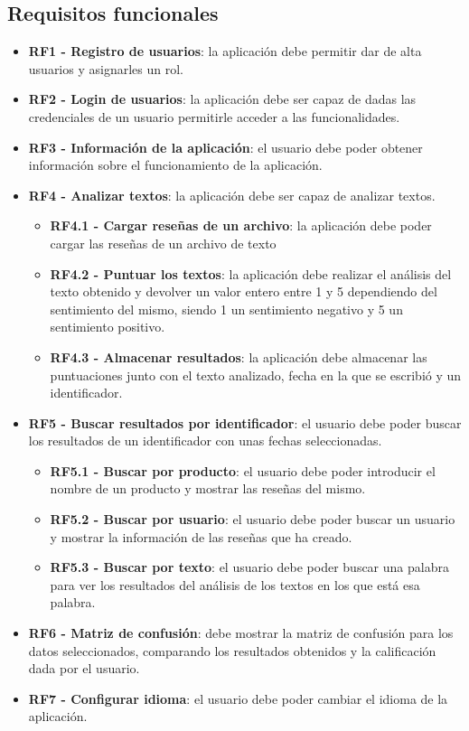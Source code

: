 \subsection{Requisitos funcionales}
\begin{itemize}
	\tightlist
	\item \textbf{RF1 - Registro de usuarios}: la aplicación debe permitir dar de alta usuarios y asignarles un rol.
	\item \textbf{RF2 - Login de usuarios}: la aplicación debe ser capaz de dadas las credenciales de un usuario permitirle acceder a las funcionalidades. 
	\item \textbf{RF3 - Información de la aplicación}: el usuario debe poder obtener información sobre el funcionamiento de la aplicación. 
	\item \textbf{RF4 - Analizar textos}: la aplicación debe ser capaz de analizar textos.
	\begin{itemize}
		\item \textbf{RF4.1 - Cargar reseñas de un archivo}: la aplicación debe poder cargar las reseñas de un archivo de texto
		\item \textbf{RF4.2 - Puntuar los textos}: la aplicación debe realizar el análisis del texto obtenido y devolver un valor entero entre 1 y 5 dependiendo del sentimiento del mismo, siendo 1 un sentimiento negativo y 5 un sentimiento positivo.     
		\item \textbf{RF4.3 - Almacenar resultados}: la aplicación debe almacenar las puntuaciones junto con el texto analizado, fecha en la que se escribió y un identificador. 
	\end{itemize}
	\item \textbf{RF5 - Buscar resultados por identificador}: el usuario debe poder buscar los resultados de un identificador con unas fechas seleccionadas. 
	\begin{itemize}
		\item \textbf{RF5.1 - Buscar por producto}: el usuario debe poder introducir el nombre de un producto y mostrar las reseñas del mismo. 
		\item \textbf{RF5.2 - Buscar por usuario}: el usuario debe poder buscar un usuario y mostrar la información de las reseñas que ha creado. 
		\item \textbf{RF5.3 - Buscar por texto}: el usuario debe poder buscar una palabra para ver los resultados del análisis de los textos en los que está esa palabra.
	\end{itemize}
	\item \textbf{RF6 - Matriz de confusión}: debe mostrar la matriz de confusión para los datos seleccionados, comparando los resultados obtenidos y la calificación dada por el usuario.
	\item \textbf{RF7 - Configurar idioma}: el usuario debe poder cambiar el idioma de la aplicación. 
\end{itemize}      
